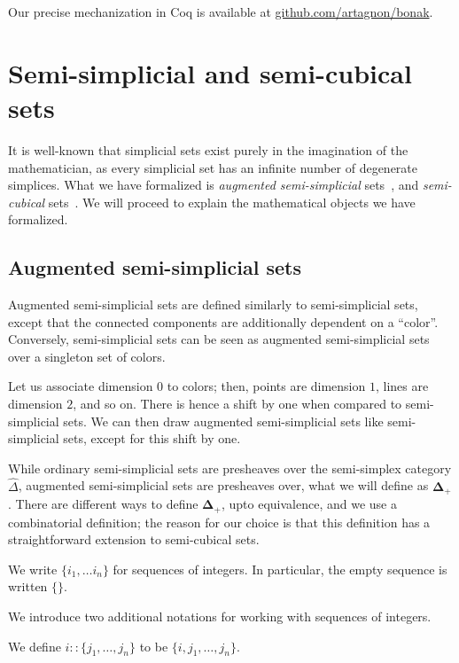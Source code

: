 \documentclass[10pt]{art.cls/art}
\newcommand{\DeltaPlus}{\ensuremath{\boldsymbol{\Delta}_+}}
\begin{document}
Our precise mechanization in Coq is available at \href{https://github.com/artagnon/bonak}{github.com/artagnon/bonak}.

\section{Semi-simplicial and semi-cubical sets}
It is well-known that simplicial sets exist purely in the imagination of the mathematician, as every simplicial set has an infinite number of degenerate simplices. What we have formalized is \emph{augmented semi-simplicial} sets~\cite{fri08,riehl11}, and \emph{semi-cubical} sets~\cite{grandis03,buchholtz17}. We will proceed to explain the mathematical objects we have formalized.

\subsection{Augmented semi-simplicial sets}
Augmented semi-simplicial sets are defined similarly to semi-simplicial sets, except that the connected components are additionally dependent on a ``color''. Conversely, semi-simplicial sets can be seen as augmented semi-simplicial sets over a singleton set of colors.

Let us associate dimension $0$ to colors; then, points are dimension $1$, lines are dimension $2$, and so on. There is hence a shift by one when compared to semi-simplicial sets. We can then draw augmented semi-simplicial sets like semi-simplicial sets, except for this shift by one.

While ordinary semi-simplicial sets are presheaves over the semi-simplex category $\hat{\Delta}$, augmented semi-simplicial sets are presheaves over, what we will define as $\DeltaPlus$. There are different ways to define $\DeltaPlus$, upto equivalence, and we use a combinatorial definition; the reason for our choice is that this definition has a straightforward extension to semi-cubical sets.

\begin{notation}
  We write $\{i_1, \ldots i_n\}$ for sequences of integers. In particular, the empty sequence is written $\{\}$.
\end{notation}

We introduce two additional notations for working with sequences of integers.

\begin{notation}[::]
  We define $i :: \{j_1, \ldots, j_n\}$ to be $\{i, j_1, \ldots, j_n\}$.
\end{notation}
\end{document}
